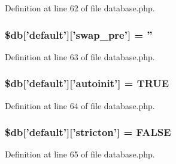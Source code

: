 Definition at line 62 of file database.\-php.

\hypertarget{production_2database_8php_af35b6847ece1c0a956c97ebb90186e45}{
\subsubsection[{\$db}]{\setlength{\rightskip}{0pt plus 5cm}\$db\mbox{[}'default'\mbox{]}\mbox{[}'swap\-\_\-pre'\mbox{]} = ''}}\label{production_2database_8php_af35b6847ece1c0a956c97ebb90186e45}


Definition at line 63 of file database.\-php.

\hypertarget{production_2database_8php_a217a1c42eadc83da9cdd9e3d694e53fa}{
\subsubsection[{\$db}]{\setlength{\rightskip}{0pt plus 5cm}\$db\mbox{[}'default'\mbox{]}\mbox{[}'autoinit'\mbox{]} = T\-R\-U\-E}}\label{production_2database_8php_a217a1c42eadc83da9cdd9e3d694e53fa}


Definition at line 64 of file database.\-php.

\hypertarget{production_2database_8php_a5722ababeee63dd26d82734e3fa83b7c}{
\subsubsection[{\$db}]{\setlength{\rightskip}{0pt plus 5cm}\$db\mbox{[}'default'\mbox{]}\mbox{[}'stricton'\mbox{]} = F\-A\-L\-S\-E}}\label{production_2database_8php_a5722ababeee63dd26d82734e3fa83b7c}


Definition at line 65 of file database.\-php.

